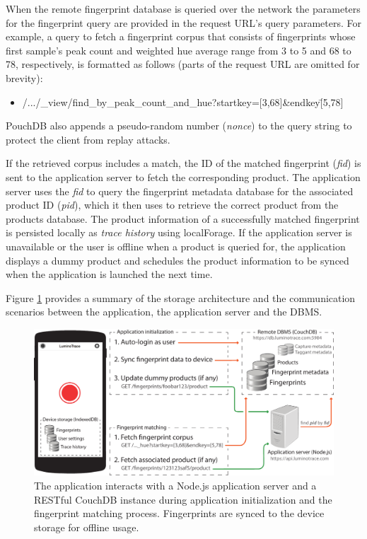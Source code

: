 \documentclass[thesis.tex]{subfiles}
\begin{document}
When the remote fingerprint database is queried over the network the parameters for the fingerprint query are provided in the request URL's query parameters. For example, a query to fetch a fingerprint corpus that consists of fingerprints whose first sample's peak count and weighted hue average range from 3 to 5 and 68 to 78, respectively, is formatted as follows (parts of the request URL are omitted for brevity):

\begin{itemize}[label=]
	\item \small  /.../\_view/find\_by\_peak\_count\_and\_hue?startkey=[3,68]\&endkey\=[5,78]
\end{itemize}

\noindent PouchDB also appends a pseudo-random number (\emph{nonce}) to the query string to protect the client from replay attacks.

If the retrieved corpus includes a match, the ID of the matched fingerprint (\emph{fid}) is sent to the application server to fetch the corresponding product. The application server uses the \emph{fid} to query the fingerprint metadata database for the associated product ID (\emph{pid}), which it then uses to retrieve the correct product from the products database. The product information of a successfully matched fingerprint is persisted locally as \emph{trace history} using localForage. If the application server is unavailable or the user is offline when a product is queried for, the application displays a dummy product and schedules the product information to be synced when the application is launched the next time.

Figure \ref{figure:application-database-flow} provides a summary of the storage architecture and the communication scenarios between the application, the application server and the DBMS.

\begin{figure}[h]
\centering \includegraphics[width=\textwidth,height=\textheight,keepaspectratio=true]{images/design_implementation/application_database_flow}
\caption{The application interacts with a Node.js application server and a RESTful CouchDB instance during application initialization and the fingerprint matching process. Fingerprints are synced to the device storage for offline usage.\label{figure:application-database-flow}}
\end{figure}
\end{document}
